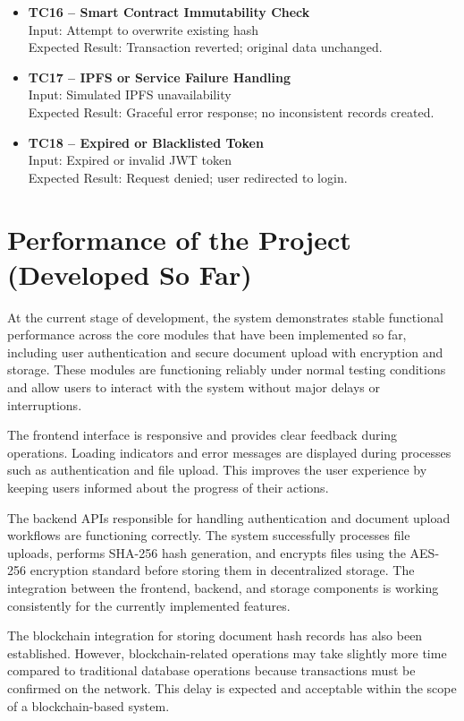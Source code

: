 \documentclass[12pt]{article}
\begin{document}
\begin{itemize}
\item \textbf{TC16 -- Smart Contract Immutability Check} \\
Input: Attempt to overwrite existing hash \\
Expected Result: Transaction reverted; original data unchanged.

\item \textbf{TC17 -- IPFS or Service Failure Handling} \\
Input: Simulated IPFS unavailability \\
Expected Result: Graceful error response; no inconsistent records created.

\item \textbf{TC18 -- Expired or Blacklisted Token} \\
Input: Expired or invalid JWT token \\
Expected Result: Request denied; user redirected to login.

\end{itemize}
\newpage
\section{Performance of the Project (Developed So Far)}

At the current stage of development, the system demonstrates stable functional performance across the core modules that have been implemented so far, including user authentication and secure document upload with encryption and storage. These modules are functioning reliably under normal testing conditions and allow users to interact with the system without major delays or interruptions.

The frontend interface is responsive and provides clear feedback during operations. Loading indicators and error messages are displayed during processes such as authentication and file upload. This improves the user experience by keeping users informed about the progress of their actions.

The backend APIs responsible for handling authentication and document upload workflows are functioning correctly. The system successfully processes file uploads, performs SHA-256 hash generation, and encrypts files using the AES-256 encryption standard before storing them in decentralized storage. The integration between the frontend, backend, and storage components is working consistently for the currently implemented features.

The blockchain integration for storing document hash records has also been established. However, blockchain-related operations may take slightly more time compared to traditional database operations because transactions must be confirmed on the network. This delay is expected and acceptable within the scope of a blockchain-based system.
\end{document}

